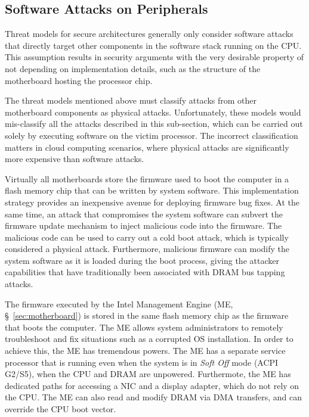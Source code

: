 \subsection{Software Attacks on Peripherals}
\label{sec:device_attacks}

Threat models for secure architectures generally only consider software attacks
that directly target other components in the software stack running on the CPU.
This assumption results in security arguments with the very desirable property
of not depending on implementation details, such as the structure of the
motherboard hosting the processor chip.

The threat models mentioned above must classify attacks from other motherboard
components as physical attacks. Unfortunately, these models would mis-classify
all the attacks described in this sub-section, which can be carried out solely
by executing software on the victim processor. The incorrect classification
matters in cloud computing scenarios, where physical attacks are significantly
more expensive than software attacks.

Virtually all motherboards store the firmware used to boot the computer in a
flash memory chip that can be written by system software. This implementation
strategy provides an inexpensive avenue for deploying firmware bug fixes. At
the same time, an attack that compromises the system software can subvert the
firmware update mechanism to inject malicious code into the firmware. The
malicious code can be used to carry out a cold boot attack, which is typically
considered a physical attack. Furthermore, malicious firmware can modify the
system software as it is loaded during the boot process, giving the attacker
capabilities that have traditionally been associated with DRAM bus tapping
attacks.

The firmware executed by the Intel Management Engine (ME,
\S~\ref{sec:motherboard}) is stored in the same flash memory chip as the
firmware that boots the computer. The ME allows system administrators to
remotely troubleshoot and fix situations such as a corrupted OS installation.
In order to achieve this, the ME has tremendous powers. The ME has a separate
service processor that is running even when the system is in \textit{Soft Off}
mode (ACPI G2/S5), when the CPU and DRAM are unpowered. Furthermote, the ME has
dedicated paths for accessing a NIC and a display adapter, which do not rely on
the CPU. The ME can also read and modify DRAM via DMA transfers, and can
override the CPU boot vector.

